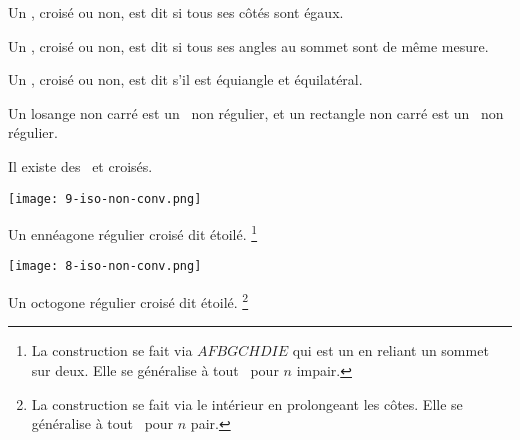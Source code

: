

\begin{defi}
    Un \ngone, croisé ou non, est dit  si tous ses côtés sont égaux.
\end{defi}


\begin{defi}
    Un \ngone, croisé ou non, est dit  si tous ses angles au sommet sont de même mesure.
\end{defi}


\begin{defi}
    Un \ngone, croisé ou non, est dit  s'il est équiangle et équilatéral.
\end{defi}


\begin{remark}
    Un losange non carré est un \nequi\ non régulier, et un rectangle non carré est un \niso\ non régulier.
\end{remark}


\begin{remark}
    Il existe des \nregs\ et croisés.

    \vspace{-1.5em}

    \begin{multicols}{2}
        \small\itshape\centering

        \null\vfill

        \texttt{[image: 9-iso-non-conv.png]}

        \smallskip
        Un ennéagone régulier croisé dit étoilé.%
        \footnote{
            La construction se fait via $AFBGCHDIE$ qui est un  en reliant un sommet sur deux. Elle se généralise à tout \nreg\ pour $n$ impair.
        }


        \columnbreak

        \null\vfill

        \texttt{[image: 8-iso-non-conv.png]}

        \smallskip
        Un octogone régulier croisé dit étoilé.%
        \footnote{
            La construction se fait via le  intérieur en prolongeant les côtes. Elle se généralise à tout \nreg\ pour $n$ pair.
        }

    \end{multicols}
\end{remark}
